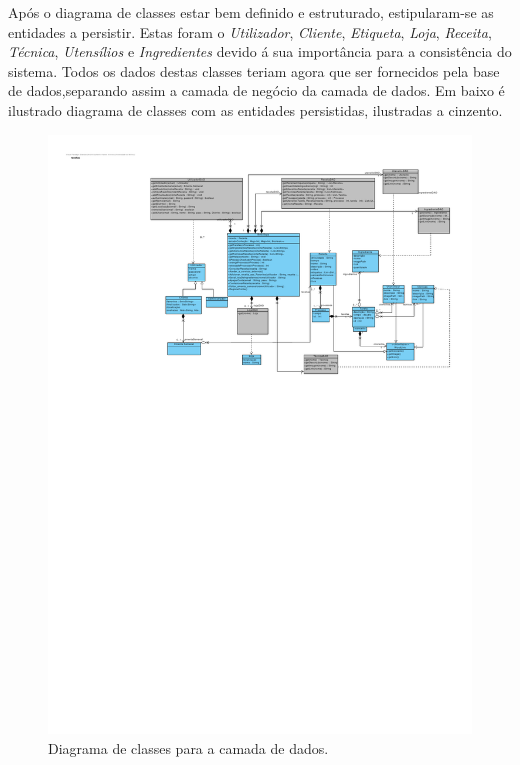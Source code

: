 Após o diagrama de classes estar bem definido e estruturado, estipularam-se as entidades a persistir.
Estas foram o \emph{Utilizador}, \emph{Cliente}, \emph{Etiqueta}, \emph{Loja}, \emph{Receita}, \emph{Técnica}, \emph{Utensílios} e \emph{Ingredientes} devido á sua importância para a consistência do sistema. Todos os dados destas classes teriam agora que ser fornecidos pela base de dados,separando assim a camada de negócio da camada de dados.
Em baixo é ilustrado diagrama de classes com as entidades persistidas, ilustradas a cinzento.
\begin{figure}[H]
  \centering
  \includegraphics[width=\textwidth]{figures/09/Diagram_classe_com_DAO.pdf}
  \caption{Diagrama de classes para a camada de dados.}
\end{figure}


